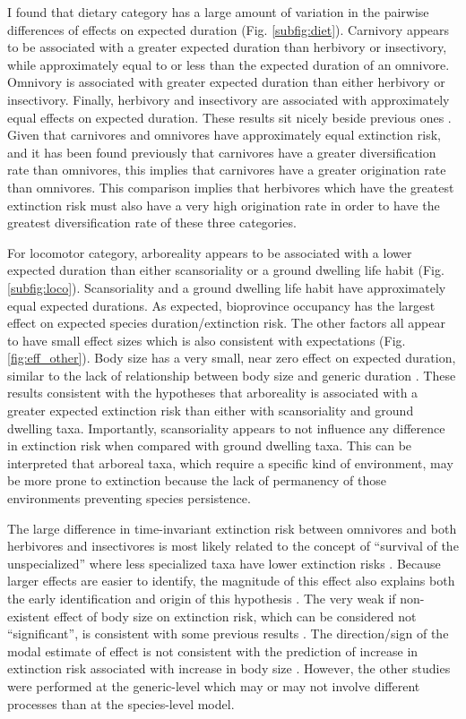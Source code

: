 \documentclass{nature}
\begin{document}
I found that dietary category has a large amount of variation in the pairwise differences of effects on expected duration (Fig. \ref{subfig:diet}). Carnivory appears to be associated with a greater expected duration than herbivory or insectivory, while approximately equal to or less than the expected duration of an omnivore. Omnivory is associated with greater expected duration than either herbivory or insectivory. Finally, herbivory and insectivory are associated with approximately equal effects on expected duration. 
These results sit nicely beside previous ones \cite{Price2012}. Given that carnivores and omnivores have approximately equal extinction risk, and it has been found previously that carnivores have a greater diversification rate than omnivores, this implies that carnivores have a greater origination rate than omnivores. This comparison implies that herbivores which have the greatest extinction risk must also have a very high origination rate in order to have the greatest diversification rate of these three categories. 

For locomotor category, arboreality appears to be associated with a lower expected duration than either scansoriality or a ground dwelling life habit (Fig. \ref{subfig:loco}). Scansoriality and a ground dwelling life habit have approximately equal expected durations. As expected, bioprovince occupancy has the largest effect on expected species duration/extinction risk. The other factors all appear to have small effect sizes which is also consistent with expectations (Fig. \ref{fig:eff_other}). Body size has a very small, near zero effect on expected duration, similar to the lack of relationship between body size and generic duration \cite{Tomiya2013}. These results consistent with the hypotheses that arboreality is associated with a greater expected extinction risk than either with scansoriality and ground dwelling taxa. Importantly, scansoriality appears to not influence any difference in extinction risk when compared with ground dwelling taxa. This can be interpreted that arboreal taxa, which require a specific kind of environment, may be more prone to extinction because the lack of permanency of those environments preventing species persistence. 

The large difference in time-invariant extinction risk between omnivores and both herbivores and insectivores is most likely related to the concept of ``survival of the unspecialized'' where less specialized taxa have lower extinction risks \cite{Liow2004a,Simpson1944}. Because larger effects are easier to identify, the magnitude of this effect also explains both the early identification and origin of this hypothesis \cite{Simpson1944}. The very weak if non-existent effect of body size on extinction risk, which can be considered not ``significant'', is consistent with some previous results \cite{Tomiya2013}. The direction/sign of the modal estimate of effect is not consistent with the prediction of increase in extinction risk associated with increase in body size \cite{Liow2008}. However, the other studies were performed at the generic-level which may or may not involve different processes than at the species-level model.
\end{document}
